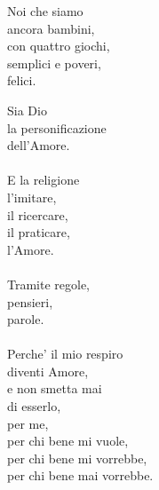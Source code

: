 \begin{haiku}
Noi che siamo\\
ancora bambini,\\
con quattro giochi,\\
semplici e poveri,\\
felici.\\
\end{haiku}

\begin{haiku}
    Sia Dio\\
    la personificazione\\
    dell'Amore.\\
    \leavevmode\\
    E la religione\\
    l'imitare,\\
    il ricercare,\\
    il praticare,\\
    l'Amore.\\
    \leavevmode\\
    Tramite regole, \\
    pensieri,\\
    parole.\\
    \leavevmode\\
    Perche' il mio respiro\\
    diventi Amore,\\
    e non smetta mai\\
    di esserlo,\\
    per me,\\
    per chi bene mi vuole,\\
    per chi bene mi vorrebbe,\\
    per chi bene mai vorrebbe.\\\
\end{haiku}





